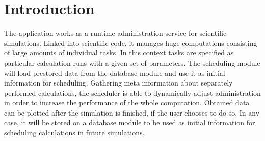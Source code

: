 \section{Introduction}






The application works as a runtime administration service for scientific simulations. Linked into scientific code, it manages huge computations consisting of large amounts of individual tasks. In this context tasks are specified as particular calculation runs with a given set of parameters. The scheduling module will load prestored data from the database module and use it as initial information for scheduling. Gathering meta information about separately performed calculations, the scheduler is able to dynamically adjust administration in order to increase the performance of the whole computation. Obtained data can be plotted after the simulation is finished, if the user chooses to do so. In any case, it will be stored on a database module to be used as initial information for scheduling calculations in future simulations. 